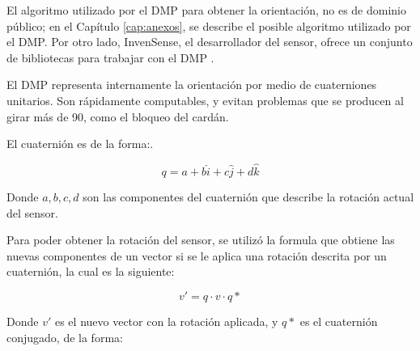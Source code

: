 El algoritmo utilizado por el DMP para obtener la orientación, no es de dominio público; en el Capítulo \ref{cap:anexos}, se describe el posible algoritmo utilizado por el DMP. Por otro lado, InvenSense, el desarrollador del sensor, ofrece un conjunto de bibliotecas para trabajar con el DMP \cite{userguideMotionDriver}.



El DMP representa internamente la orientación por medio de cuaterniones unitarios. Son rápidamente computables, y evitan problemas que se producen al girar más de 90\degree, como el bloqueo del cardán.

El cuaternión es de la forma:.

\begin{equation}
	q = a + b\hat{i} + c\hat{j} + d\hat{k}
	\label{eq:eqcuaternion}
\end{equation}

Donde $a, b, c, d$ son las componentes del cuaternión que describe la rotación actual del sensor.

Para poder obtener la rotación del sensor, se utilizó la formula que obtiene las nuevas componentes de un vector si se le aplica una rotación descrita por un cuaternión, la cual es la siguiente:

\begin{equation}
	v' = q\cdot v\cdot q*
	\label{eq:rotacioncuaternion}
\end{equation}

Donde $v'$ es el nuevo vector con la rotación aplicada, y $q*$ es el cuaternión conjugado, de la forma:

